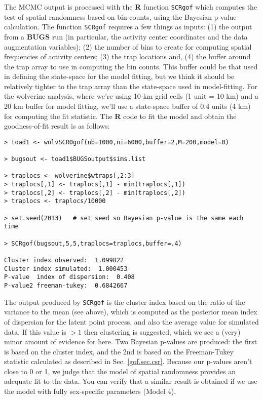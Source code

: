The MCMC output is processed with  the {\bf R} function
\mbox{\tt SCRgof} which
computes the test of spatial randomness based on bin counts, using the 
Bayesian p-value calculation. The function \mbox{\tt SCRgof} requires
 a few things as inputs: (1) the output from a
{\bf BUGS} run (in particular, the activity center coordinates and the
data augmentation variables); (2) the number of bins to create for
computing spatial frequencies of activity centers;  (3) the trap
locations and, (4) the buffer
around the trap array to use in computing the bin counts.  This buffer could be that used
in defining the state-space for the model fitting, but we think it should be
relatively tighter to the trap array than the state-space used in
model-fitting. For the wolverine analysis,  where we're using 10-km grid cells
(1 unit = 10 km) and a 20 km buffer for model fitting, we'll use a
state-space buffer of  0.4 units (4 km) for
computing the fit statistic.
The {\bf R} code to fit the model and obtain the goodness-of-fit
result is as follows:
{\small
\begin{verbatim}
> toad1 <- wolvSCR0gof(nb=1000,ni=6000,buffer=2,M=200,model=0)

> bugsout <- toad1$BUGSoutput$sims.list

> traplocs <- wolverine$wtraps[,2:3]
> traplocs[,1] <- traplocs[,1] - min(traplocs[,1])
> traplocs[,2] <- traplocs[,2] - min(traplocs[,2])
> traplocs <- traplocs/10000

> set.seed(2013)   # set seed so Bayesian p-value is the same each time

> SCRgof(bugsout,5,5,traplocs=traplocs,buffer=.4)

Cluster index observed:  1.099822
Cluster index simulated:  1.000453
P-value  index of dispersion:  0.408
P-value2 freeman-tukey:  0.6842667
\end{verbatim}
}
The output produced by \mbox{\tt SCRgof} is the cluster index based on
the ratio of the variance to the mean
(see above), which is computed as the posterior mean index of
dispersion for the latent point process, and also the average value
for simulated data. If this value is $>1$ then clustering is
suggested, which we see a (very) minor amount of evidence for here. Two
Bayesian p-values are produced: the first is based on the cluster
index, and the 2nd is based on the Freeman-Tukey statistic calculated
as described in Sec. \ref{gof.sec.csr}.  Because our p-values aren't
close to 0 or 1, we judge that the model of spatial randomness
provides an adequate fit to the data. You can verify that a similar result is obtained if
we use the model with fully sex-specific parameters (Model 4).

